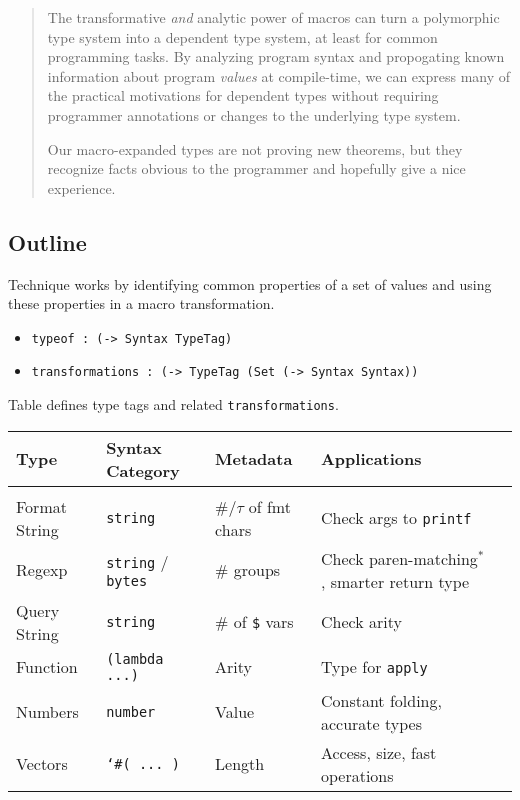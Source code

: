 \documentclass{article}
\begin{document}
\begin{abstract}
  The transformative \emph{and} analytic power of macros can turn
   a polymorphic type system into a dependent type system, at least
   for common programming tasks.
  By analyzing program syntax and propogating known information about program
   \emph{values} at compile-time, we can express many of the practical
   motivations for dependent types without requiring programmer annotations
   or changes to the underlying type system.

  Our macro-expanded types are not proving new theorems,
   but they recognize facts obvious to the programmer and hopefully
   give a nice experience.
\end{abstract}

\subsection*{Outline}

Technique works by identifying common properties of a set of
 values and using these properties in a macro transformation.

\begin{itemize}
  \item {\texttt{typeof : (-> Syntax TypeTag)}}
  \item {\texttt{transformations : (-> TypeTag (Set (-> Syntax Syntax))}}
\end{itemize}

Table defines type tags and related \texttt{transformations}.

\vspace{0.4cm}
\begin{center}
\hspace{-3.5cm}\begin{tabular}{l l l l l}
  Type          &    Syntax Category          &    Metadata    &    Applications    \\\hline\hline
\\Format String &       {\tt string}          &     \#/$\tau$ of fmt chars & Check args to {\tt printf}
\\Regexp        &  {\tt string} / {\tt bytes} & \# groups & Check paren-matching${}^*$, smarter return type
\\Query String  &  {\tt string}               & \# of {\tt \$} vars & Check arity
\\Function      &  {\tt (lambda ...)}         & Arity        & Type for {\tt apply}
\\Numbers       &  {\tt number}               & Value & Constant folding, accurate types
\\Vectors       &  {\tt `\#( ... )}            & Length & Access, size, fast operations
\end{tabular}
\end{center}
\end{document}
